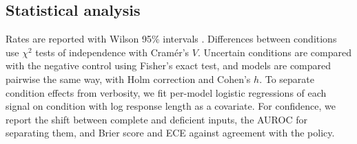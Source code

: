 \subsection{Statistical analysis}
Rates are reported with Wilson 95\% intervals \cite{wilson1927}. Differences between conditions use $\chi^2$ tests of independence with Cram\'er's $V$. Uncertain conditions are compared with the negative control using Fisher's exact test, and models are compared pairwise the same way, with Holm correction \cite{holm1979} and Cohen's $h$. To separate condition effects from verbosity, we fit per-model logistic regressions of each signal on condition with log response length as a covariate. For confidence, we report the shift between complete and deficient inputs, the AUROC for separating them, and Brier score and ECE against agreement with the policy.
